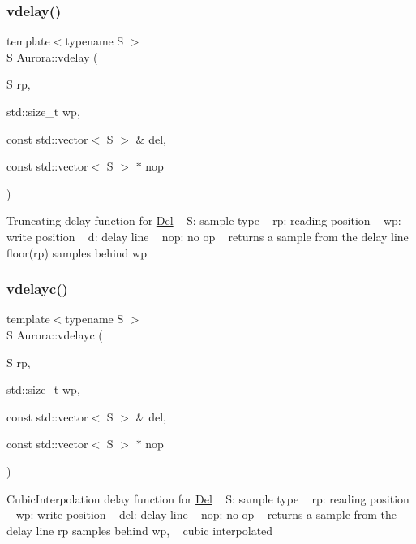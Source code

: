 \subsubsection{\texorpdfstring{vdelay()}{vdelay()}}
{\footnotesize\ttfamily template$<$typename S $>$ \\
S Aurora\+::vdelay (\begin{DoxyParamCaption}\item[{S}]{rp,  }\item[{std\+::size\+\_\+t}]{wp,  }\item[{const std\+::vector$<$ S $>$ \&}]{del,  }\item[{const std\+::vector$<$ S $>$ $\ast$}]{nop }\end{DoxyParamCaption})\hspace{0.3cm}{\ttfamily [inline]}}

Truncating delay function for \hyperlink{class_aurora_1_1_del}{Del} ~\newline
S\+: sample type ~\newline
rp\+: reading position ~\newline
wp\+: write position ~\newline
d\+: delay line ~\newline
nop\+: no op ~\newline
returns a sample from the delay line floor(rp) samples behind wp \mbox{\label{namespace_aurora_a123381990bd6cdcd199852e31a8987c6}} 
\subsubsection{\texorpdfstring{vdelayc()}{vdelayc()}}
{\footnotesize\ttfamily template$<$typename S $>$ \\
S Aurora\+::vdelayc (\begin{DoxyParamCaption}\item[{S}]{rp,  }\item[{std\+::size\+\_\+t}]{wp,  }\item[{const std\+::vector$<$ S $>$ \&}]{del,  }\item[{const std\+::vector$<$ S $>$ $\ast$}]{nop }\end{DoxyParamCaption})\hspace{0.3cm}{\ttfamily [inline]}}

Cubic\+Interpolation delay function for \hyperlink{class_aurora_1_1_del}{Del} ~\newline
S\+: sample type ~\newline
rp\+: reading position ~\newline
wp\+: write position ~\newline
del\+: delay line ~\newline
nop\+: no op ~\newline
returns a sample from the delay line rp samples behind wp, ~\newline
cubic interpolated \mbox{\label{namespace_aurora_aa162bda687dbe871e0517cfae199378c}} 
